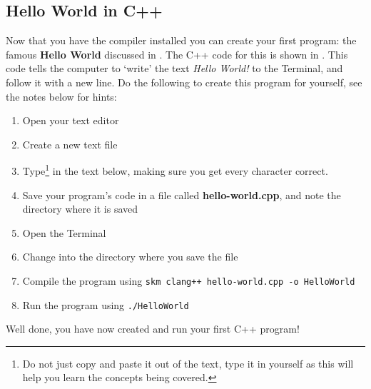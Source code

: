 \subsection{Hello World in C++} %
\label{sub:hello_world_in_c}

Now that you have the compiler installed you can create your first program: the famous \textbf{Hello World} discussed in . The C++ code for this is shown in . This code tells the computer to `write' the text \emph{Hello World!} to the Terminal, and follow it with a new line. Do the following to create this program for yourself, see the notes below for hints:

\begin{enumerate}
  \item Open your text editor
  \item Create a new text file
  \item Type\footnote{Do not just copy and paste it out of the text, type it in yourself as this will help you learn the concepts being covered.} in the text below, making sure you get every character correct.
  \item Save your program's code in a file called \textbf{hello-world.cpp}, and note the directory where it is saved
  \item Open the Terminal
  \item Change into the directory where you save the file
  \item Compile the program using \texttt{skm clang++ hello-world.cpp -o HelloWorld}
  \item Run the program using \texttt{./HelloWorld}
\end{enumerate}

Well done, you have now created and run your first C++ program!

\csection
{
}


